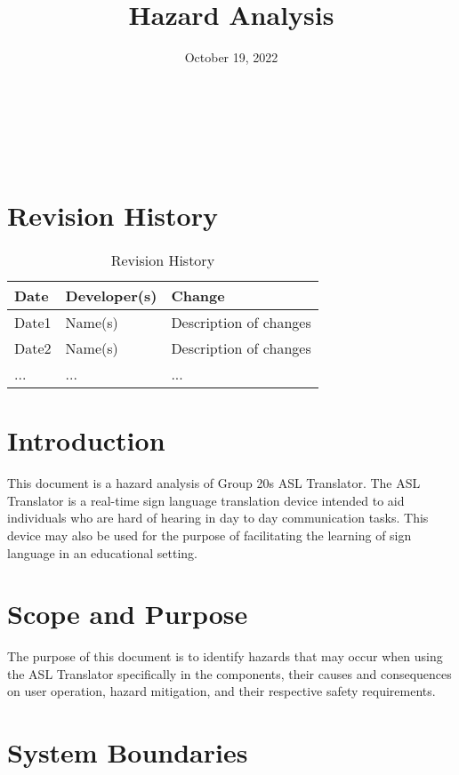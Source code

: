 \documentclass{article}
\title{Hazard Analysis\\\progname}
\author{\authname}
\date{October 19, 2022}
\begin{document}
\maketitle

~\newpage

\tableofcontents

~\newpage

\section*{Revision History}
\begin{table}[hp]
\caption{Revision History} \label{TblRevisionHistory}
\begin{tabularx}{\textwidth}{llX}
\toprule
\textbf{Date} & \textbf{Developer(s)} & \textbf{Change}\\
\midrule
Date1 & Name(s) & Description of changes\\
Date2 & Name(s) & Description of changes\\
... & ... & ...\\
\bottomrule
\end{tabularx}
\end{table}

\newpage

\section{Introduction}

This document is a hazard analysis of Group 20\textquotesingle s ASL Translator. The ASL Translator is a real-time sign language translation device intended to aid 
individuals who are hard of hearing in day to day communication tasks. This device may also be used for the purpose of facilitating the learning of 
sign language in an educational setting.\\

\section{Scope and Purpose}

The purpose of this document is to identify hazards that may occur when using the ASL Translator specifically in the components, their causes and consequences on user 
operation, hazard mitigation, and their respective safety requirements.\\

\section{System Boundaries}
\end{document}
